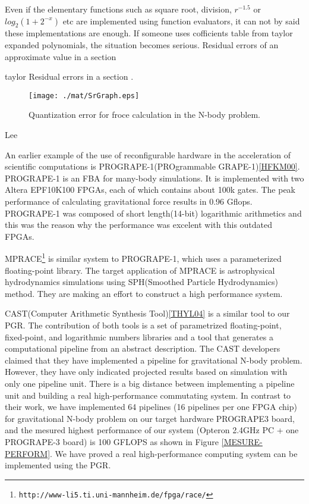 \documentclass{llncs}
\begin{document}
Even if the elementary functions such as square root, division,
$r^{-1.5}$ or $log_{2}(1+2^{-x})$ etc are implemented using function
evaluators, it can not by said these implementations are enough.  If
someone uses cofficients table from taylor expanded polynomials, the
situation becomes serious. Residual errors of an approximate value in a section

taylor Residual errors in a section .

\begin{figure}[htb]
\begin{center}
\texttt{[image: ./mat/SrGraph.eps]}
\caption{Quantization error for froce calculation in the N-body problem.}
\label{SrError}
\end{center}
\end{figure}



Lee\cite{XXX}

An earlier example of the use of reconfigurable hardware in the
acceleration of scientific computations is PROGRAPE-1(PROgrammable
GRAPE-1)\ref{HFKM00}. PROGRAPE-1 is an FBA for many-body
simulations. It is implemented with two Altera EPF10K100 FPGAs, each
of which contains about 100k gates. The peak performance of
calculating gravitational force results in 0.96 Gflops.  PROGRAPE-1
was composed of short length(14-bit) logarithmic arithmetics and this
was the reason why the performance was excelent with this outdated
FPGAs.

MPRACE\footnote{\tt http://www-li5.ti.uni-mannheim.de/fpga/race/} is
similar system to PROGRAPE-1, which uses a parameterized
floating-point library\cite{LKM02}.  The target application of MPRACE
is astrophysical hydrodynamics simulations using SPH(Smoothed Particle
Hydrodynamics) method.  They are making an effort to construct a high
performance system.


CAST(Computer Arithmetic Synthesis Tool)\ref{THYL04} is a similar tool
to our PGR.  The contribution of both tools is a set of parametrized
floating-point, fixed-point, and logarithmic numbers libraries and a
tool that generates a computational pipeline from an abstract description.
The CAST developers claimed that they have implemented
a pipeline for gravitational N-body problem. 
However, they have only indicated 
projected results based on simulation with only one pipeline unit.
There is a big distance between implementing a pipeline unit and building a real
high-performance commutating system. In contrast to their work,
we have implemented 64 pipelines (16 pipelines per one FPGA chip)
for gravitational N-body problem on our target hardware PROGRAPE3 board,
and the mesured highest performance of our system
(Opteron 2.4GHz PC + one PROGRAPE-3 board) is 100 GFLOPS as shown in Figure \ref{MESURE-PERFORM}.
We have proved a real high-performance computing system
can be implemented using the PGR.
\end{document}
